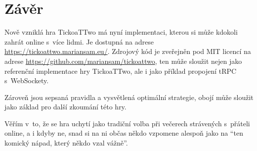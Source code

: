 \chapter*{Závěr}

Nově vzniklá hra TickoaTTwo má nyní implementaci, kterou si může kdokoli zahrát
online s~více lidmi. Je dostupná na adrese \url{https://tickoattwo.mariansam.eu/}.
Zdrojový kód je zveřejněn pod MIT licencí na adrese
\url{https://github.com/mariansam/tickoattwo}, ten může sloužit nejen jako
referenční implementace hry TickoaTTwo, ale i jako příklad propojení tRPC
s~WebSockety.

Zároveň jsou sepsaná pravidla a vysvětlená optimální strategie, obojí může
sloužit jako základ pro další zkoumání této hry.

Věřím v~to, že se hra uchytí jako tradiční volba při večerech strávených
s~přáteli online, a i kdyby ne, snad si na ni občas někdo vzpomene alespoň jako
na \enquote{ten komický nápad, který někdo vzal vážně}.
